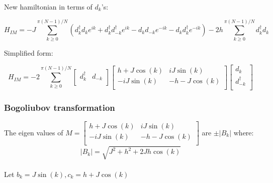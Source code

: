 \documentclass[11pt,a4paper]{article}
\begin{document}
	    New hamiltonian in terms of $d_{k}$'s:
	    
	    \begin{equation}
	    		H_{IM} = -J\sum_{k\geq 0}^{ \pi (N-1)/N} (d_{k}^{\dagger}d_{k}e^{ik} + d_{k}^{\dagger}d_{-k}^{\dagger}e^{ik}-d_{k}d_{-k}e^{-ik}-d_{k}d_{k}^{\dagger}e^{-ik}) - 2h\sum_{k\geq 0}^{ \pi (N-1)/N} d_{k}^{\dagger}d_{k}
	    \end{equation}
	    
	    Simplified form:
	    
	    \begin{equation}
	    H_{IM} = -2\sum_{k\geq0}^{ \pi (N-1)/N}\begin{bmatrix}
	    d_{k}^{\dagger} & d_{-k}\\
	    \end{bmatrix} \begin{bmatrix}
	    h + J \cos(k) & i J \sin(k)\\
	    - i J \sin(k) & -h - J \cos(k) \\
	    \end{bmatrix}\begin{bmatrix}
	    d_{k}\\d_{-k}^{\dagger}\\
	    \end{bmatrix}
	    \end{equation}
	     
	    \subsubsection{Bogoliubov transformation}
	    The eigen values of $ M =  \begin{bmatrix}
	    h + J \cos(k) & i J \sin(k)\\
	    - i J \sin(k) & -h - J \cos(k) \\
	    \end{bmatrix}$ are $\pm |B_{k}|$ where:
	    \begin{equation}
	    |B_{k}| = \sqrt{J^{2}+h^{2}+2 J h \cos(k)}
	    \end{equation}
	    
	     \paragraph{   }
	    Let $b_{k} = J \sin(k) , c_{k} = h + J \cos(k)$
	    
	   
	    
\end{document}
